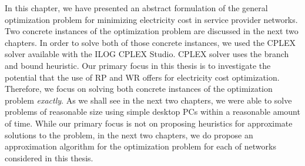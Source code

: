 In this chapter, we have presented an abstract formulation of the general optimization problem for minimizing electricity cost in service provider networks. Two concrete instances of the optimization problem are discussed in the next two chapters. In order to solve both of those concrete instances, we used the CPLEX solver available with the ILOG CPLEX Studio. CPLEX solver uses the branch and bound heuristic. Our primary focus in this thesis is to investigate the potential that the use of RP and WR offers for electricity cost optimization. Therefore, we focus on solving both concrete instances of the optimization problem \textit{exactly}. As we shall see in the next two chapters, we were able to solve problems of reasonable size using simple desktop PCs within a reasonable amount of time. While our primary focus is not on proposing heuristics for approximate solutions to the problem, in the next two chapters, we do propose an approximation algorithm for the optimization problem for each of networks considered in this thesis. 